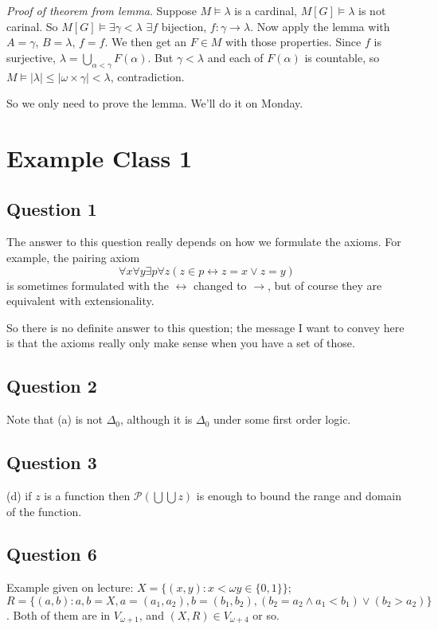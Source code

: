 \documentclass[a4paper]{article}
\begin{document}
\emph{Proof of theorem from lemma}. Suppose $M \vDash \lambda$ is a cardinal, $M[G] \vDash \lambda$ is not carinal. So $M[G] \vDash \exists \gamma < \lambda$ $\exists f$ bijection, $f:\gamma \to \lambda$. Now apply the lemma with $A = \gamma$, $B = \lambda$, $f=f$. We then get an $F \in M$ with those properties. Since $f$ is surjective, $\lambda = \bigcup_{\alpha < \gamma} F(\alpha)$. But $\gamma < \lambda$ and each of $F(\alpha)$ is countable, so $M \vDash |\lambda| \leq |\omega \times \gamma| < \lambda$, contradiction.

So we only need to prove the lemma. We'll do it on Monday.

\newpage

\section{Example Class 1}

\subsection{Question 1}

The answer to this question really depends on how we formulate the axioms. For example, the pairing axiom
\[
    \forall x \forall y \exists p \forall z (z \in p \leftrightarrow z = x \vee z = y)
\]
is sometimes formulated with the $\leftrightarrow$ changed to $\to$, but of course they are equivalent with extensionality.

So there is no definite answer to this question; the message I want to convey here is that the axioms really only make sense when you have a set of those.

\subsection{Question 2}
Note that (a) is not $\Delta_0$, although it is $\Delta_0$ under some first order logic.

\subsection{Question 3}
(d) if $z$ is a function then $\mathcal{P}(\bigcup\bigcup z)$ is enough to bound the range and domain of the function.

\subsection{Question 6}
Example given on lecture: $X=\{(x,y): x< \omega y \in \{0,1\}\}$;\\
$R=\{(a,b) : a,b = X, a=(a_1,a_2), b=(b_1,b_2), (b_2=a_2 \wedge a_1<b_1) \vee (b_2 > a_2)\}$. Both of them are in $V_{\omega +1}$, and $(X,R) \in V_{\omega+4}$ or so.
\end{document}
